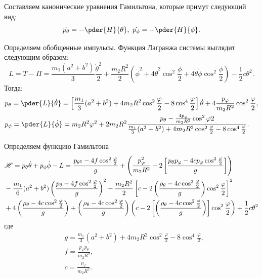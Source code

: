     Составляем канонические уравнения Гамильтона, которые примут следующий вид:
    \[
        \dot{p_\theta} = -\pder{H}{\theta},\ \dot{p_\phi} = -\pder{H}{\phi}.
    \]
    
    Определяем обобщенные импульсы. Функция Лагранжа системы выглядит
    следующим образом:
    \[
        L = T - \varPi = \frac{m_1(a^2 + b^2)}{3}\frac{\dot{\theta}^2}{2} +
        \frac{m_2R^2}{2}\left(\dot{\phi}^2 + 4\dot{\theta}^2\cos^2\frac{\phi}{2}
        + 4\dot{\theta}\dot{\phi}\cos^2\frac{\phi}{2}\right) - \frac{1}{2}c\theta^2.
    \]
    Тогда:
    \begin{align*}
        & p_\theta = \pder{L}{\dot{\theta}} = \left[\frac{m_1}{3}(a^2+b^2)
        + 4m_2 R^2 \cos^{2}{\frac{\varphi}{2}}
        - 8\cos^4{\frac{\varphi}{2}}\right]\dot{\theta}
        + 4\frac{p_\varphi}{m_2 R^2}\cos^{2}{\frac{\varphi}{2}}, \\
        & p_\phi = \pder{L}{\dot{\phi}} = m_2 R^2 \varphi^2 
        + 2m_2 R^2\frac{p_\theta - \frac{4p_\varphi}{m_2 R^2}\cos^2{\varphi}{2}}
        {\frac{m_1}{3}(a^2+b^2)+4m_2R^2\cos^2\frac{\varphi}{2}
        - 8\cos^4\frac{\varphi}{2}}.
    \end{align*}
    
    Определяем функцию Гамильтона 
    \begin{align*}
        & \mathscr{H} = p_\theta\dot{\theta} + p_\phi\dot{\phi} - L =
        \frac{p_{\theta^2} - 4f\cos^2\frac{\varphi}{2}}{g}
        + \left(\frac{p^{2}_{\varphi}}{m_2 R^2} 
        - 2\left[\frac{p_\theta p_\varphi - 4cp_\varphi 
        \cos^2\frac{\varphi}{2}}{g}\right] \right) \\
        & - \frac{m_1}{6}(a^2+b^2)\left(\frac{p_\theta 
        - 4f\cos^2\frac{\varphi}{2}}{g}\right)^{2}
        - \frac{m_2 R^2}{2}\left[ c - 2\left( 
        \frac{\rho_{\theta} - 4c\cos^2\frac{\varphi}{2}}{g} 
        \right)\cos^2\frac{\varphi}{2} \right]^2 \\
        & + 4\left( \frac{\rho_\theta - 4c\cos^2\frac{\varphi}{2}}{g} \right)
        + \left( \frac{\rho_\theta - 4c\cos^2\frac{\varphi}{2}}{g} \right)
        \left( c - 2\left[ \left( \frac{\rho_\theta - 4c
        \cos^2\frac{\varphi}{2}}{g} \right) \right]
        \cos^2\frac{\varphi}{2} \right) + \frac{1}{2}c\theta^2
    \end{align*}
    где 
    \begin{align*}
        & g = \frac{m_1}{3}(a^2+b^2)+4m_2R^2\cos^2\frac{\varphi}{2}
        - 8\cos^4\frac{\varphi}{2}, \\
        & f = \frac{p_\varphi p_\theta}{m_2 R^2}, \\
        & c = \frac{p_\varphi}{m_2 R^2}.
    \end{align*}
    
